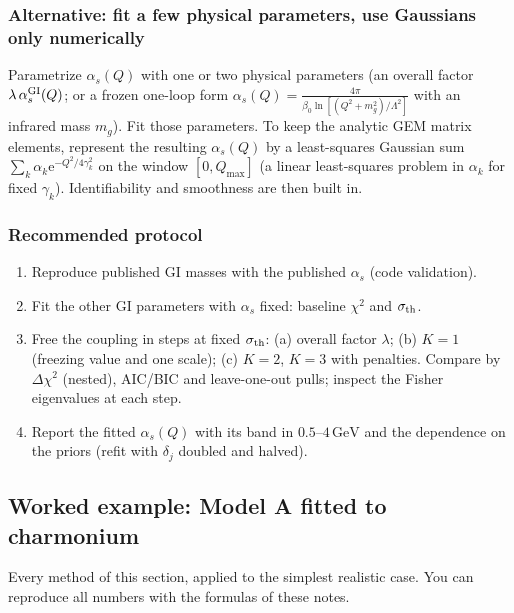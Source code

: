 \documentclass[11pt,a4paper]{article}
\numberwithin{equation}{section}
\theoremstyle{definition}
\theoremstyle{plain}
\theoremstyle{remark}
\numberwithin{algorithm}{section}
\newcommand{\as}{\alpha_s}
\newcommand{\ee}{\mathrm{e}}
\newcommand{\GeV}{\,\mathrm{GeV}}
\begin{document}
\subsubsection{Alternative: fit a few physical parameters, use Gaussians only numerically}
Parametrize $\as(Q)$ with one or two physical parameters (an overall factor $\lambda\,\as^{\rm GI}(Q)$; or a frozen one-loop form $\as(Q)=\frac{4\pi}{\beta_0\ln[(Q^2+m_g^2)/\Lambda^2]}$ with an infrared mass $m_g$). Fit those parameters. To keep the analytic GEM matrix elements, represent the resulting $\as(Q)$ by a least-squares Gaussian sum $\sum_k\alpha_k\ee^{-Q^2/4\gamma_k^2}$ on the window $[0,Q_{\max}]$ (a linear least-squares problem in $\alpha_k$ for fixed $\gamma_k$). Identifiability and smoothness are then built in.

\subsubsection{Recommended protocol}
\begin{enumerate}[leftmargin=1.5em,itemsep=2pt]
\item Reproduce published GI masses with the published $\as$ (code validation).
\item Fit the other GI parameters with $\as$ fixed: baseline $\chi^2$ and $\sigma_{\rm th}$.
\item Free the coupling in steps at fixed $\sigma_{\rm th}$: (a) overall factor $\lambda$; (b) $K=1$ (freezing value and one scale); (c) $K=2$, $K=3$ with penalties. Compare by $\Delta\chi^2$ (nested), AIC/BIC and leave-one-out pulls; inspect the Fisher eigenvalues at each step.
\item Report the fitted $\as(Q)$ with its band in $0.5$--$4\GeV$ and the dependence on the priors (refit with $\delta_j$ doubled and halved).
\end{enumerate}

\subsection{Worked example: Model A fitted to charmonium}\label{sec:worked}
Every method of this section, applied to the simplest realistic case. You can reproduce all numbers with the formulas of these notes.
\end{document}
